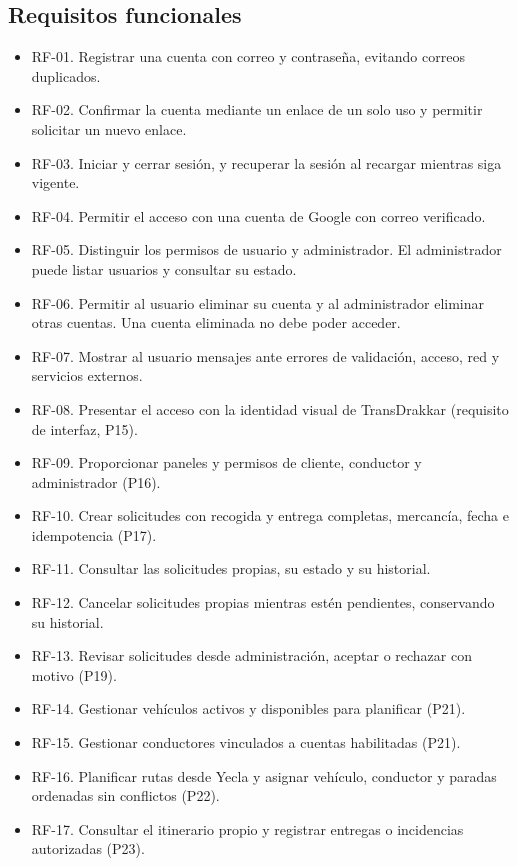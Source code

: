 \subsection{Requisitos funcionales}
\begin{itemize}
\item RF-01. Registrar una cuenta con correo y contraseña, evitando correos duplicados.
\item RF-02. Confirmar la cuenta mediante un enlace de un solo uso y permitir solicitar un nuevo enlace.
\item RF-03. Iniciar y cerrar sesión, y recuperar la sesión al recargar mientras siga vigente.
\item RF-04. Permitir el acceso con una cuenta de Google con correo verificado.
\item RF-05. Distinguir los permisos de usuario y administrador. El administrador puede listar usuarios y consultar su estado.
\item RF-06. Permitir al usuario eliminar su cuenta y al administrador eliminar otras cuentas. Una cuenta eliminada no debe poder acceder.
\item RF-07. Mostrar al usuario mensajes ante errores de validación, acceso, red y servicios externos.
\item RF-08. Presentar el acceso con la identidad visual de TransDrakkar (requisito de interfaz, P15).
\item RF-09. Proporcionar paneles y permisos de cliente, conductor y administrador (P16).
\item RF-10. Crear solicitudes con recogida y entrega completas, mercancía, fecha e idempotencia (P17).
\item RF-11. Consultar las solicitudes propias, su estado y su historial.
\item RF-12. Cancelar solicitudes propias mientras estén pendientes, conservando su historial.
\item RF-13. Revisar solicitudes desde administración, aceptar o rechazar con motivo (P19).
\item RF-14. Gestionar vehículos activos y disponibles para planificar (P21).
\item RF-15. Gestionar conductores vinculados a cuentas habilitadas (P21).
\item RF-16. Planificar rutas desde Yecla y asignar vehículo, conductor y paradas ordenadas sin conflictos (P22).
\item RF-17. Consultar el itinerario propio y registrar entregas o incidencias autorizadas (P23).
\end{itemize}
